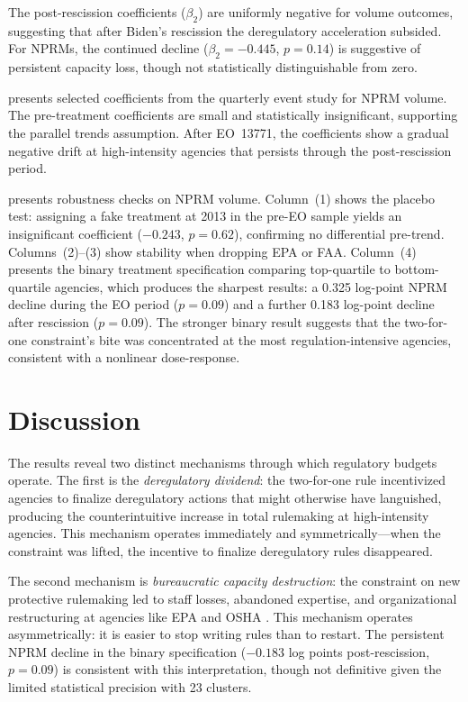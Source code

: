 \documentclass[12pt]{article}
\begin{document}
The post-rescission coefficients ($\beta_2$) are uniformly negative for volume outcomes, suggesting that after Biden's rescission the deregulatory acceleration subsided. For NPRMs, the continued decline ($\beta_2 = -0.445$, $p = 0.14$) is suggestive of persistent capacity loss, though not statistically distinguishable from zero.



 presents selected coefficients from the quarterly event study for NPRM volume. The pre-treatment coefficients are small and statistically insignificant, supporting the parallel trends assumption. After EO~13771, the coefficients show a gradual negative drift at high-intensity agencies that persists through the post-rescission period.



 presents robustness checks on NPRM volume. Column~(1) shows the placebo test: assigning a fake treatment at 2013 in the pre-EO sample yields an insignificant coefficient ($-0.243$, $p = 0.62$), confirming no differential pre-trend. Columns~(2)--(3) show stability when dropping EPA or FAA. Column~(4) presents the binary treatment specification comparing top-quartile to bottom-quartile agencies, which produces the sharpest results: a 0.325 log-point NPRM decline during the EO period ($p = 0.09$) and a further 0.183 log-point decline after rescission ($p = 0.09$). The stronger binary result suggests that the two-for-one constraint's bite was concentrated at the most regulation-intensive agencies, consistent with a nonlinear dose-response.

\section{Discussion}
\label{sec:discussion}

The results reveal two distinct mechanisms through which regulatory budgets operate. The first is the \textit{deregulatory dividend}: the two-for-one rule incentivized agencies to finalize deregulatory actions that might otherwise have languished, producing the counterintuitive increase in total rulemaking at high-intensity agencies. This mechanism operates immediately and symmetrically---when the constraint was lifted, the incentive to finalize deregulatory rules disappeared.

The second mechanism is \textit{bureaucratic capacity destruction}: the constraint on new protective rulemaking led to staff losses, abandoned expertise, and organizational restructuring at agencies like EPA and OSHA \citep{carpenter2004deadline}. This mechanism operates asymmetrically: it is easier to stop writing rules than to restart. The persistent NPRM decline in the binary specification ($-0.183$ log points post-rescission, $p = 0.09$) is consistent with this interpretation, though not definitive given the limited statistical precision with 23 clusters.
\end{document}
